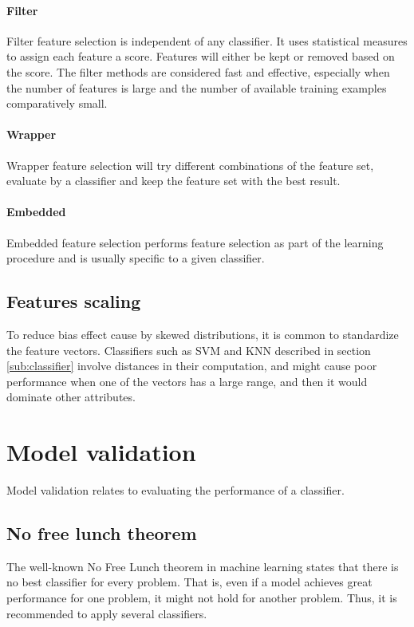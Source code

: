 \documentclass[USenglish]{ifimaster}  %
\begin{document}
	
\paragraph{Filter}
Filter feature selection is independent of any classifier. It uses statistical measures to assign each feature a score. Features will either be kept or removed based on the score. The filter methods are considered fast and effective, especially when the number of features is large and the number of available training examples comparatively small.  
	
	
\paragraph{Wrapper}
Wrapper feature selection will try different combinations of the feature set, evaluate by a classifier and keep the feature set with the best result.
	
	
\paragraph{Embedded}
Embedded feature selection performs feature selection as part of the learning procedure and is usually specific to a given classifier.

\subsection{Features scaling} \label{subsec:scaling}
To reduce bias effect cause by skewed distributions, it is common to standardize the feature vectors. Classifiers such as SVM and KNN described in section \ref{sub:classifier} involve distances in their computation, and might cause poor performance when one of the vectors has a large range, and then it would dominate other attributes.

	
\section{Model validation}
Model validation relates to evaluating the performance of a classifier. 
	
\subsection{No free lunch theorem} \label{seq:nofree}
The well-known No Free Lunch theorem\cite{NOFREELUNCH} in machine learning states that there is no best classifier for every problem. That is, even if a model achieves great performance for one problem, it might not hold for another problem. Thus, it is recommended to apply several classifiers.
	
\end{document}
